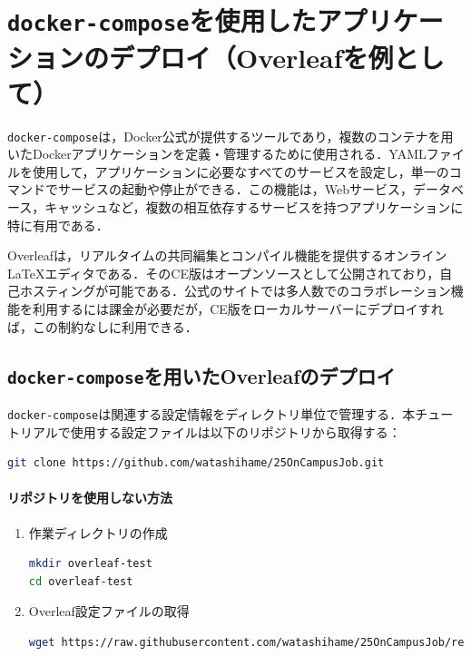 \section{\texttt{docker-compose}を使用したアプリケーションのデプロイ（Overleafを例として）}

\texttt{docker-compose}は，Docker公式が提供するツールであり，複数のコンテナを用いたDockerアプリケーションを定義・管理するために使用される．YAMLファイルを使用して，アプリケーションに必要なすべてのサービスを設定し，単一のコマンドでサービスの起動や停止ができる．この機能は，Webサービス，データベース，キャッシュなど，複数の相互依存するサービスを持つアプリケーションに特に有用である．

Overleafは，リアルタイムの共同編集とコンパイル機能を提供するオンライン \LaTeX エディタである．そのCE版はオープンソースとして公開されており，自己ホスティングが可能である．公式のサイトでは多人数でのコラボレーション機能を利用するには課金が必要だが，CE版をローカルサーバーにデプロイすれば，この制約なしに利用できる．

\subsection{\texttt{docker-compose}を用いたOverleafのデプロイ}
\texttt{docker-compose}は関連する設定情報をディレクトリ単位で管理する．本チュートリアルで使用する設定ファイルは以下のリポジトリから取得する：

\begin{lstlisting}[language=bash]
git clone https://github.com/watashihame/25OnCampusJob.git
\end{lstlisting}

\paragraph{リポジトリを使用しない方法}
\begin{enumerate}
\item 作業ディレクトリの作成
\begin{lstlisting}[language=bash]
mkdir overleaf-test
cd overleaf-test
\end{lstlisting}

\item Overleaf設定ファイルの取得
\begin{lstlisting}[language=bash]
wget https://raw.githubusercontent.com/watashihame/25OnCampusJob/refs/heads/main/overleaf-test/docker-compose.yml
\end{lstlisting}
\end{enumerate}

